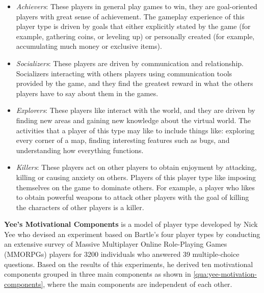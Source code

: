 \begin{itemize}
\item \emph{Achievers}: These players in general play games to win, they are goal-oriented players with great sense of achievement. The gameplay experience of this player type is driven by goals that either explicitly stated by the game (for example, gathering coins, or leveling up) or personally created (for example, accumulating much money or exclusive items).

\item  \emph{Socializers}: These players are driven by communication and relationship. Socializers interacting with others players using communication tools provided by the game, and they find the greatest reward in what the others players have to say about them in the games.

\item \emph{Explorers}: These players like interact with the world, and they are driven by finding new areas and gaining new knowledge about the virtual world. The activities that a player of this type may like to include things like: exploring every corner of a map, finding interesting features such as bugs, and understanding how everything functions.

\item \emph{Killers}: These players act on other players to obtain enjoyment by attacking, killing or causing anxiety on others. Players of this player type like imposing themselves on the game to dominate others. For example, a player who likes to obtain powerful weapons to attack other players with the goal of killing the characters of other players is a killer.
\end{itemize}

\textbf{Yee's Motivational Components} \cite{Yee2006, Yee2006a} is a model of player type developed by Nick Yee who devised an experiment based on Bartle's four player types by conducting an extensive survey of Massive Multiplayer Online Role-Playing Games (MMORPGs) players for 3200 individuals who answered 39 multiple-choice questions. Based on the results of this experiments, he derived ten motivational components grouped in three main components as shown in \autoref{qua:yee-motivation-components}, where the main components are independent of each other. 

